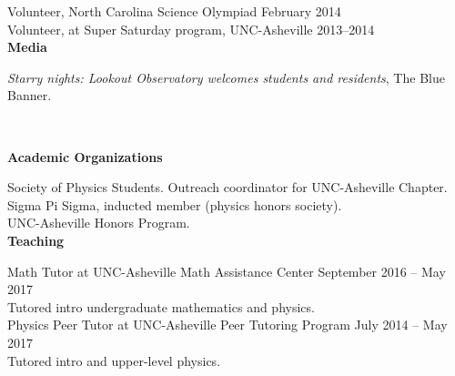\documentclass[letterpaper, 11pt]{article}
\newcommand{\noi}{\noindent}
\begin{document}
\noi Volunteer, North Carolina Science Olympiad \hfill February 2014
\\

\noi Volunteer, at Super Saturday program, UNC-Asheville \hfill 2013--2014
\\

\noi \textbf{Media}

\noi \emph{Starry nights: Lookout Observatory welcomes students and residents}, The Blue Banner.
\begin{sloppypar}
\noi {}
\\
\end{sloppypar}

\noi \textbf{Academic Organizations}

\noi Society of Physics Students. Outreach coordinator for UNC-Asheville Chapter.
\\

\noi Sigma Pi Sigma, inducted member (physics honors society).
\\

\noi UNC-Asheville Honors Program.
\\

\noi \textbf{Teaching}

\noi Math Tutor at UNC-Asheville Math Assistance Center \hfill September 2016 -- May 2017
\\
Tutored intro undergraduate mathematics and physics.
\\

\noi Physics Peer Tutor at UNC-Asheville Peer Tutoring Program \hfill July 2014 -- May 2017
\\
Tutored intro and upper-level physics.
\\
\end{document}
